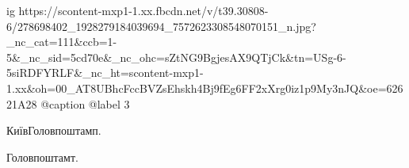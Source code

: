  
 
 
 
 

\ifcmt
  ig https://scontent-mxp1-1.xx.fbcdn.net/v/t39.30808-6/278698402_1928279184039694_7572623308548070151_n.jpg?_nc_cat=111&ccb=1-5&_nc_sid=5cd70e&_nc_ohc=sZtNG9BgjesAX9QTjCk&tn=USg-6-5siRDFYRLF&_nc_ht=scontent-mxp1-1.xx&oh=00_AT8UBhcFccBVZsEhskh4Bj9fEg6FF2xXrg0iz1p9My3nJQ&oe=62621A28
  @caption @label 3
\fi

КиївГоловпоштамп.

Головпоштамт.

